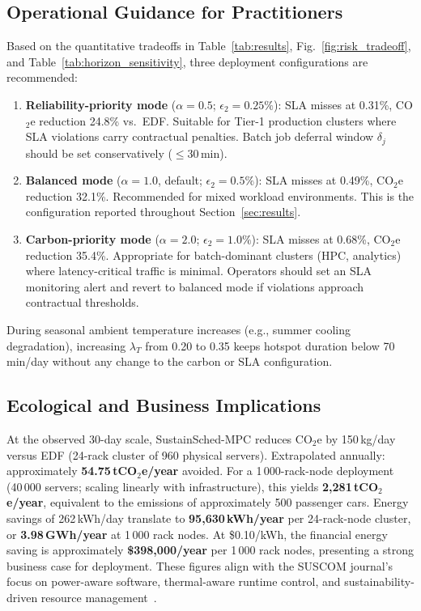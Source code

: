 \documentclass[a4paper,fleqn]{cas-dc}
\begin{document}
\subsection{Operational Guidance for Practitioners}
\label{sec:guidance}

Based on the quantitative tradeoffs in Table~\ref{tab:results}, Fig.~\ref{fig:risk_tradeoff}, and Table~\ref{tab:horizon_sensitivity}, three deployment configurations are recommended:

\begin{enumerate}
  \item \textbf{Reliability-priority mode} ($\alpha = 0.5$; $\epsilon_2=0.25\%$): SLA misses at 0.31\%, CO$_2$e reduction 24.8\% vs.\ EDF. Suitable for Tier-1 production clusters where SLA violations carry contractual penalties. Batch job deferral window $\delta_j$ should be set conservatively ($\leq$30\,min).

  \item \textbf{Balanced mode} ($\alpha = 1.0$, default; $\epsilon_2=0.5\%$): SLA misses at 0.49\%, CO$_2$e reduction 32.1\%. Recommended for mixed workload environments. This is the configuration reported throughout Section~\ref{sec:results}.

  \item \textbf{Carbon-priority mode} ($\alpha = 2.0$; $\epsilon_2=1.0\%$): SLA misses at 0.68\%, CO$_2$e reduction 35.4\%. Appropriate for batch-dominant clusters (HPC, analytics) where latency-critical traffic is minimal. Operators should set an SLA monitoring alert and revert to balanced mode if violations approach contractual thresholds.
\end{enumerate}

During seasonal ambient temperature increases (e.g., summer cooling degradation), increasing $\lambda_T$ from 0.20 to 0.35 keeps hotspot duration below 70\,min/day without any change to the carbon or SLA configuration.

\subsection{Ecological and Business Implications}
\label{sec:implications}

At the observed 30-day scale, SustainSched-MPC reduces CO$_2$e by 150\,kg/day versus EDF (24-rack cluster of 960 physical servers). Extrapolated annually: approximately \textbf{54.75\,tCO$_2$e/year} avoided. For a 1\,000-rack-node deployment (40\,000 servers; scaling linearly with infrastructure), this yields \textbf{2{,}281\,tCO$_2$e/year}, equivalent to the emissions of approximately 500 passenger cars. Energy savings of 262\,kWh/day translate to \textbf{95{,}630\,kWh/year} per 24-rack-node cluster, or \textbf{3.98\,GWh/year} at 1\,000 rack nodes. At \$0.10/kWh, the financial energy saving is approximately \textbf{\$398{,}000/year} per 1\,000 rack nodes, presenting a strong business case for deployment. These figures align with the SUSCOM journal's focus on power-aware software, thermal-aware runtime control, and sustainability-driven resource management~\cite{ref-peltonen25,ref-zakarya24review,ref-paul23review}.
\end{document}
